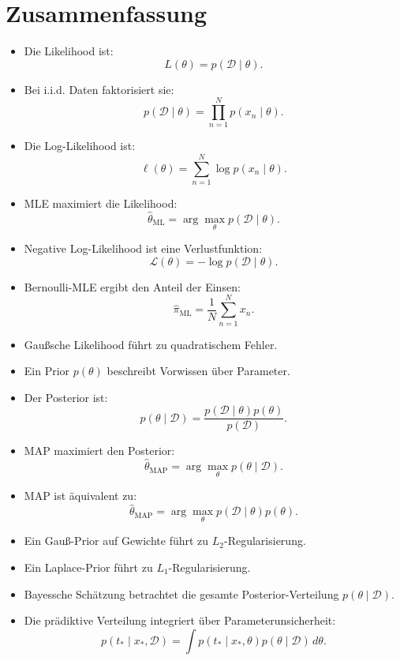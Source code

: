 \section{Zusammenfassung}

\begin{itemize}
    \item Die Likelihood ist:
    \[
        L(\theta)
        =
        p(\mathcal{D}\mid\theta).
    \]
    \item Bei i.i.d. Daten faktorisiert sie:
    \[
        p(\mathcal{D}\mid\theta)
        =
        \prod_{n=1}^{N}
        p(x_n\mid\theta).
    \]
    \item Die Log-Likelihood ist:
    \[
        \ell(\theta)
        =
        \sum_{n=1}^{N}
        \log p(x_n\mid\theta).
    \]
    \item MLE maximiert die Likelihood:
    \[
        \hat{\theta}_{\mathrm{ML}}
        =
        \arg\max_{\theta}
        p(\mathcal{D}\mid\theta).
    \]
    \item Negative Log-Likelihood ist eine Verlustfunktion:
    \[
        \mathcal{L}(\theta)
        =
        -\log p(\mathcal{D}\mid\theta).
    \]
    \item Bernoulli-MLE ergibt den Anteil der Einsen:
    \[
        \hat{\pi}_{\mathrm{ML}}
        =
        \frac{1}{N}
        \sum_{n=1}^{N}
        x_n.
    \]
    \item Gaußsche Likelihood führt zu quadratischem Fehler.
    \item Ein Prior \(p(\theta)\) beschreibt Vorwissen über Parameter.
    \item Der Posterior ist:
    \[
        p(\theta\mid\mathcal{D})
        =
        \frac{
            p(\mathcal{D}\mid\theta)p(\theta)
        }{
            p(\mathcal{D})
        }.
    \]
    \item MAP maximiert den Posterior:
    \[
        \hat{\theta}_{\mathrm{MAP}}
        =
        \arg\max_{\theta}
        p(\theta\mid\mathcal{D}).
    \]
    \item MAP ist äquivalent zu:
    \[
        \hat{\theta}_{\mathrm{MAP}}
        =
        \arg\max_{\theta}
        p(\mathcal{D}\mid\theta)p(\theta).
    \]
    \item Ein Gauß-Prior auf Gewichte führt zu \(L_2\)-Regularisierung.
    \item Ein Laplace-Prior führt zu \(L_1\)-Regularisierung.
    \item Bayessche Schätzung betrachtet die gesamte Posterior-Verteilung \(p(\theta\mid\mathcal{D})\).
    \item Die prädiktive Verteilung integriert über Parameterunsicherheit:
    \[
        p(t_* \mid x_*,\mathcal{D})
        =
        \int
        p(t_* \mid x_*,\theta)
        p(\theta\mid\mathcal{D})
        \,d\theta.
    \]
\end{itemize}

